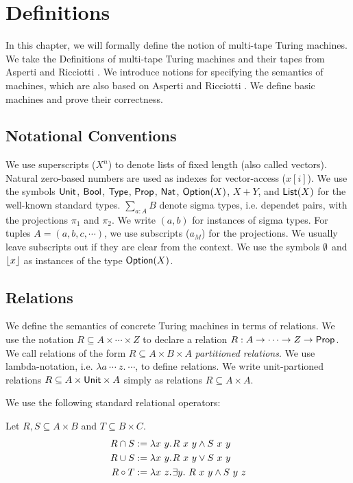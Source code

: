 \chapter{Definitions}
\label{chap:definitions}

In this chapter, we will formally define the notion of multi-tape Turing machines.  We take the Definitions of multi-tape Turing machines and their
tapes from Asperti and Ricciotti \cite{asperti2015}.  We introduce notions for specifying the semantics of machines, which are also based on Asperti
and Ricciotti \cite{asperti2015}.  We define basic machines and prove their correctness.


\section{Notational Conventions}
\label{sec:notational-conventions}

We use superscripts ($X^n$) to denote lists of fixed length (also called vectors).  Natural zero-based numbers are used as indexes for vector-access
($x[i]$).  We use the symbols $\textsf{Unit}$, $\textsf{Bool}$, $\textsf{Type}$, $\textsf{Prop}$, $\textsf{Nat}$, $\textsf{Option}(X)$, $X+Y$, and $\textsf{List}(X)$ for the well-known standard types.
$\sum_{a:A} B$ denote sigma types, i.e. dependet pairs, with the projections $\pi_1$ and $\pi_2$.  We write $(a,b)$ for instances of sigma types. For
tuples $A = (a, b, c, \cdots)$, we use subscripts ($a_M$) for the projections.  We usually leave subscripts out if they are clear from the context.
We use the symbols $\emptyset$ and $\left\lfloor {x}\right\rfloor$ as instances of the type $\textsf{Option}(X)$.


\section{Relations}
\label{sec:relations}

We define the semantics of concrete Turing machines in terms of relations.  We use the notation $R \subseteq A \times \cdots \times Z$ to declare a
relation $R : A \rightarrow \cdots \rightarrow Z \rightarrow \textsf{Prop}$.  We call relations of the form $R \subseteq A \times B \times A$ \emph{partitioned relations}.  We
use lambda-notation, i.e. $\lambda a~\cdots~z.~\cdots$, to define relations.  We write unit-partioned relations $R \subseteq A \times \textsf{Unit} \times A$
simply as relations $R \subseteq A \times A$.

We use the following standard relational operators:

\begin{definition}
  Let $R, S \subseteq A \times B$ and $T \subseteq B \times C$.
  \begin{align*}
    R \cap S &:= \lambda x~y{.}\hskip.7ptR~x~y \land S~x~y \\
    R \cup S &:= \lambda x~y{.}\hskip.7ptR~x~y \lor S~x~y \\
    R \circ T &:= \lambda x~z{.}\hskip.7pt\exists y.~R~x~y \land S~y~z
  \end{align*}
\end{definition}

